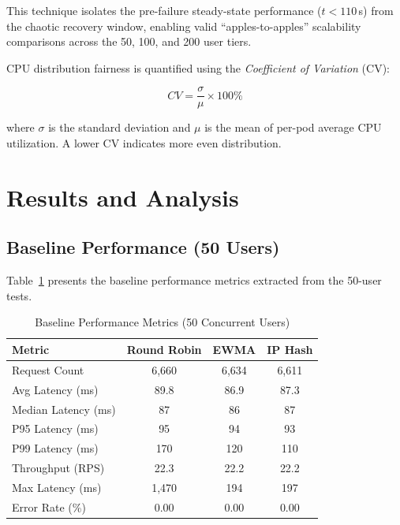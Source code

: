 \documentclass[conference]{IEEEtran}
\begin{document}
This technique isolates the pre-failure steady-state performance ($t < 110$\,s) from the chaotic recovery window, enabling valid ``apples-to-apples'' scalability comparisons across the 50, 100, and 200 user tiers.

CPU distribution fairness is quantified using the \textit{Coefficient of Variation} (CV):

\begin{equation}
    CV = \frac{\sigma}{\mu} \times 100\%
    \label{eq:cv}
\end{equation}

\noindent where $\sigma$ is the standard deviation and $\mu$ is the mean of per-pod average CPU utilization. A lower CV indicates more even distribution.


\section{Results and Analysis}

\subsection{Baseline Performance (50 Users)}

Table~\ref{tab:baseline} presents the baseline performance metrics extracted from the 50-user tests.

\begin{table}[H]
\centering
\caption{Baseline Performance Metrics (50 Concurrent Users)}
\label{tab:baseline}
\begin{tabular}{l c c c}
\toprule
\textbf{Metric} & \textbf{Round Robin} & \textbf{EWMA} & \textbf{IP Hash} \\
\midrule
Request Count & 6,660 & 6,634 & 6,611 \\
Avg Latency (ms) & 89.8 & 86.9 & 87.3 \\
Median Latency (ms) & 87 & 86 & 87 \\
P95 Latency (ms) & 95 & 94 & 93 \\
P99 Latency (ms) & 170 & 120 & 110 \\
Throughput (RPS) & 22.3 & 22.2 & 22.2 \\
Max Latency (ms) & 1,470 & 194 & 197 \\
Error Rate (\%) & 0.00 & 0.00 & 0.00 \\
\bottomrule
\end{tabular}
\end{table}
\end{document}
